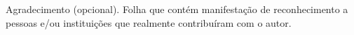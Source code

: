 \begin{agradecimentos}
	Agradecimento (opcional). Folha que contém manifestação de reconhecimento a pessoas e/ou instituições que realmente contribuíram com o autor.	
\end{agradecimentos}